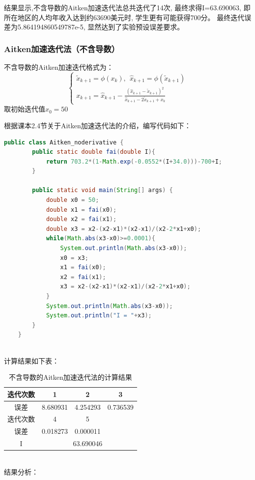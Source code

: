 \documentclass[12pt,a4paper]{article}
\begin{document}
结果显示,不含导数的Aitken加速迭代法总共迭代了14次,
最终求得I=63.690063,
即所在地区的人均年收入达到约63690美元时,
学生更有可能获得700分。
最终迭代误差为5.864194860549787e-5,
显然达到了实验预设误差要求。

\subsubsection{Aitken加速迭代法（不含导数）}
不含导数的Aitken加速迭代格式为：
\begin{equation}
    \left\{
\begin{array}{c}
	\tilde{x}_{k+1}=\phi(x_k),~~\hat{x}_{k+1}=\phi(\tilde{x}_{k+1})\\
	x_{k+1}=\hat{x}_{k+1}-\frac{(\hat{x}_{k+1}-\tilde{x}_{k+1})^2}{\hat{x}_{k+1}-2\tilde{x}_{k+1}+x_k}
\end{array}
\right. 
\end{equation}
取初始迭代值$x_0=50$

根据课本2.4节关于Aitken加速迭代法的介绍，编写代码如下：
\begin{lstlisting}[language={java}]
    public class Aitken_noderivative {
        public static double fai(double I){
            return 703.2*(1-Math.exp(-0.0552*(I+34.0)))-700+I;
        }
    
        public static void main(String[] args) {
            double x0 = 50;
            double x1 = fai(x0);
            double x2 = fai(x1);
            double x3 = x2-(x2-x1)*(x2-x1)/(x2-2*x1+x0);
            while(Math.abs(x3-x0)>=0.0001){
                System.out.println(Math.abs(x3-x0));
                x0 = x3;
                x1 = fai(x0);
                x2 = fai(x1);
                x3 = x2-(x2-x1)*(x2-x1)/(x2-2*x1+x0);
            }
            System.out.println(Math.abs(x3-x0));
            System.out.println("I = "+x3);
        }
    }    
\end{lstlisting}
~\\
计算结果如下表：
\begin{table}[ht]
    \centering
    \begin{tabular}{|c|c|c|c|} 
     \hline
     迭代次数 & 1 & 2 & 3 \\ [0.5ex] 
     \hline
     误差 & 8.680931 & 4.254293 & 0.736539 \\ 
     \hline
     迭代次数 & 4 & 5 & \\
     \hline
     误差 & 0.018273 & 0.000011 & \\
     \hline
     I & \multicolumn{3}{c|}{63.690046} \\
     \hline
    \end{tabular}
    \caption{不含导数的Aitken加速迭代法的计算结果}
    \label{table:6}
\end{table}
~\\
结果分析：
\end{document}
